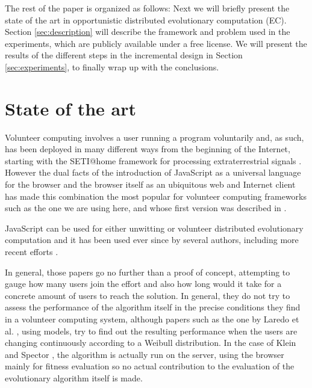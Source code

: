 \documentclass[runningheads,a4paper]{llncs}\usepackage[]{graphicx}\usepackage[]{color}
\begin{document}
The rest of the paper is organized as follows: Next we will briefly
present the state of the art in opportunistic distributed evolutionary
computation (EC). Section \ref{sec:description} will describe the
framework and problem used in the experiments, which are publicly
available under a free license. We will present the results of the
different steps in the incremental design in Section
\ref{sec:experiments}, to finally wrap up with the conclusions. 

\section{State of the art}
\label{sec:soa}

Volunteer computing involves a user running a program voluntarily
and, as such, has been deployed in many different ways from the
beginning of the Internet, starting with the SETI@home framework for
processing extraterrestrial signals \cite{david-seti:home}. However
the dual facts of the introduction of JavaScript as a universal language for the
browser and the browser itself as an ubiquitous web and Internet client has
made this combination the most popular for volunteer computing
frameworks such as the one we are using here, and whose first version
was described in \cite{DBLP:conf/gecco/GuervosG15}.

JavaScript can be used for either unwitting
\cite{unwitting-ec,boldrin2007distributed} or volunteer 
\cite{langdon:2005:metas,gecco07:workshop:dcor} distributed
evolutionary computation and it has been used ever since by several
authors, including more recent efforts
\cite{duda2013distributed,DBLP:journals/corr/abs-0801-1210,EvoStar2014:jsEO}. 

In general, those papers go no further than a proof of concept,
attempting to gauge how many users join the effort and also how long
would it take for a concrete amount of users to reach the solution. In
general, they do not try to assess the performance of the algorithm
itself in the precise conditions they find in a volunteer computing
system, although papers such as the one by Laredo et
al. \cite{churn08:ijhpsa}, using models, try to find out the resulting
performance when the users are changing continuously according to a
Weibull distribution. In the case of Klein and Spector \cite{unwitting-ec}, the algorithm
is actually run on the server, using the browser mainly for fitness
evaluation so no actual contribution to the evaluation of the
evolutionary algorithm itself is made.
\end{document}
